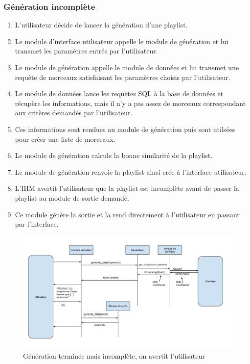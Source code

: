 \subsubsection{Génération incomplète}

\begin{enumerate}
\item L'utilisateur décide de lancer la génération d'une playlist.
\item Le module d'interface utilisateur appelle le module de génération et 
lui transmet les paramètres entrés par l'utilisateur.
\item Le module de génération appelle le module de données et lui transmet 
une requête de morceaux satisfaisant les paramètres choisis par l'utilisateur.
\item Le module de données lance les requêtes SQL à la base de données et
récupère les informations, mais il n'y a pas assez de morceaux correspondant 
aux critères demandés par l'utilisateur.
\item Ces informations sont rendues au module de génération puis sont 
utilsées pour créer une liste de morceaux.
\item Le module de génération calcule la bonne similarité de la playlist.
\item Le module de génération renvoie la playlist ainsi crée à l'interface 
utilisateur.
\item L'IHM avertit l'utilisateur que la playlist est incomplète avant de 
passer la playlist au module de sortie demandé.
\item Ce module génére la sortie et la rend directement à l'utilisateur en 
passant par l'interface.
\end{enumerate}

\begin{figure}[!h]
\includegraphics[width=14cm]{data/generation_incomplete.png}
\caption{Génération terminée mais incomplète, on avertit l'utilisateur}
\end{figure}
 

